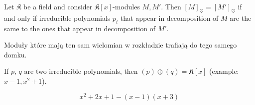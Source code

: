 \begin{lemma}\color{red}
  Let $\mathfrak{K}$ be a field and consider $\mathfrak{K}[x]$-modules $M, M'$. Then $[M]_\heartsuit=[M']_\heartsuit$ if and only if irreducible polynomials $p_i$ that appear in decomposition of $M$ are the same to the ones that appear in decomposition of $M'$.
\end{lemma}




\color{green}Moduły które mają ten sam wielomian w rozkładzie trafiają do tego samego domku.

{\color{green} If $p$, $q$ are two irreducible polynomials, then $(p)\oplus  (q)=\mathfrak{K}[x]$ (example: $x-1, x^2+1$).}


$$x^2+2x+1-(x-1)(x+3)$$
